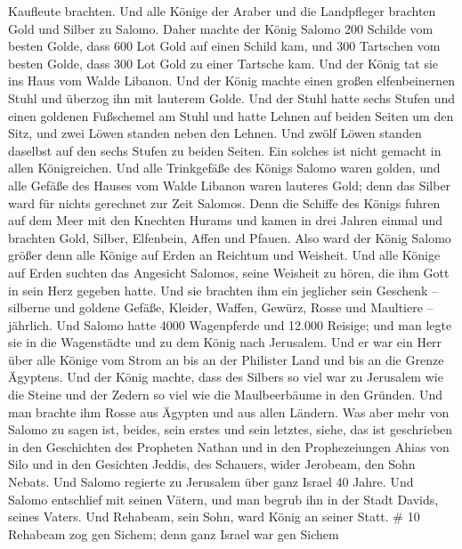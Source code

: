 Kaufleute brachten. Und alle Könige der Araber und die Landpfleger
brachten Gold und Silber zu Salomo.  Daher machte der König
Salomo 200 Schilde vom besten Golde, dass 600 Lot Gold auf einen Schild
kam,  und 300 Tartschen vom besten Golde, dass 300 Lot Gold
zu einer Tartsche kam.  Und der König tat sie ins Haus vom
Walde Libanon. Und der König machte einen großen elfenbeinernen Stuhl
und überzog ihn mit lauterem Golde.  Und der Stuhl hatte
sechs Stufen und einen goldenen Fußschemel am Stuhl und hatte Lehnen auf
beiden Seiten um den Sitz, und zwei Löwen standen neben den Lehnen.
 Und zwölf Löwen standen daselbst auf den sechs Stufen zu
beiden Seiten. Ein solches ist nicht gemacht in allen Königreichen.
 Und alle Trinkgefäße des Königs Salomo waren golden, und
alle Gefäße des Hauses vom Walde Libanon waren lauteres Gold; denn das
Silber ward für nichts gerechnet zur Zeit Salomos.  Denn
die Schiffe des Königs fuhren auf dem Meer mit den Knechten Hurams und
kamen in drei Jahren einmal und brachten Gold, Silber, Elfenbein, Affen
und Pfauen.  Also ward der König Salomo größer denn alle
Könige auf Erden an Reichtum und Weisheit.  Und alle Könige
auf Erden suchten das Angesicht Salomos, seine Weisheit zu hören, die
ihm Gott in sein Herz gegeben hatte.  Und sie brachten ihm
ein jeglicher sein Geschenk -- silberne und goldene Gefäße, Kleider,
Waffen, Gewürz, Rosse und Maultiere -- jährlich.  Und
Salomo hatte 4000 Wagenpferde und 12.000 Reisige; und man legte sie in
die Wagenstädte und zu dem König nach Jerusalem.  Und er
war ein Herr über alle Könige vom Strom an bis an der Philister Land und
bis an die Grenze Ägyptens.  Und der König machte, dass des
Silbers so viel war zu Jerusalem wie die Steine und der Zedern so viel
wie die Maulbeerbäume in den Gründen.  Und man brachte ihm
Rosse aus Ägypten und aus allen Ländern.  Was aber mehr von
Salomo zu sagen ist, beides, sein erstes und sein letztes, siehe, das
ist geschrieben in den Geschichten des Propheten Nathan und in den
Prophezeiungen Ahias von Silo und in den Gesichten Jeddis, des Schauers,
wider Jerobeam, den Sohn Nebats.  Und Salomo regierte zu
Jerusalem über ganz Israel 40 Jahre.  Und Salomo entschlief
mit seinen Vätern, und man begrub ihn in der Stadt Davids, seines
Vaters. Und Rehabeam, sein Sohn, ward König an seiner Statt. \# 10
 Rehabeam zog gen Sichem; denn ganz Israel war gen Sichem
